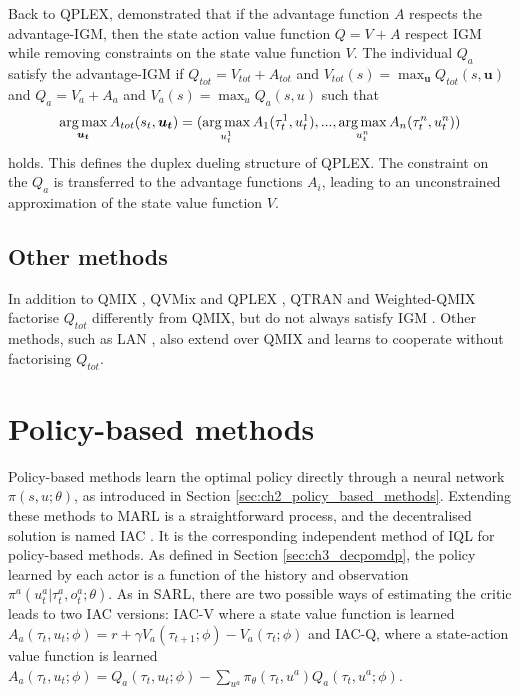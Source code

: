 Back to QPLEX, \citet{wang2021qplex} demonstrated that if the advantage function $A$ respects the advantage-IGM, then the state action value function $Q = V + A$ respect IGM while removing constraints on the state value function $V$.
The individual $Q_a$ satisfy the advantage-IGM if $Q_{tot}=V_{tot}+A_{tot}$ and $V_{tot}(s)=\max_{\mathbf{u}} Q_{tot}(s, \mathbf{u})$ and $Q_a=V_a+A_a$ and $V_a(s)=\max_{u} Q_a(s, u)$ such that 
\begin{equation}
    \argmax_{\mathbf{u_t}} A_{tot}(s_t, \mathbf{u_t}) =(\argmax_{u_t^{1}} A_{1}(\tau_t^{1}, u_t^{1}),...,\argmax_{u_t^{n}} A_{n}(\tau_t^{n}, u_t^{n}))    \label{eq:ch3_adv_igm}
\end{equation}
holds.
This defines the duplex dueling structure of QPLEX.
The constraint on the $Q_a$ is transferred to the advantage functions $A_i$, leading to an unconstrained approximation of the state value function $V$.

\subsection{Other methods}
In addition to QMIX \citep{Rashid2018}, QVMix \citep{leroy2020qvmix} and QPLEX \citep{wang2021qplex}, QTRAN \citep{Son2019QTRAN:Learning} and Weighted-QMIX \citep{rashid2020weighted} factorise $Q_{tot}$ differently from QMIX, but do not always satisfy IGM \citep{Son2019QTRAN:Learning}.
Other methods, such as LAN \citep{avalos2023local}, also extend over QMIX and learns to cooperate without factorising $Q_{tot}$.

\section{Policy-based methods}
\label{sec:ch3_policy}
Policy-based methods learn the optimal policy directly through a neural network $\pi(s, u;\theta)$, as introduced in Section \ref{sec:ch2_policy_based_methods}.
Extending these methods to MARL is a straightforward process, and the decentralised solution is named IAC \citep{foerster2017coma}. 
It is the corresponding independent method of IQL for policy-based methods.
As defined in Section \ref{sec:ch3_decpomdp}, the policy learned by each actor is a function of the history and observation $\pi^{a}(u_t^{a}|\tau_t^{a},o_t^{a};\theta)$.
As in SARL, there are two possible ways of estimating the critic leads to two IAC versions: IAC-V where a state value function is learned $A_a(\tau_t, u_t; \phi) = r + \gamma V_a(\tau_{t+1}; \phi) - V_a(\tau_t; \phi)$ and IAC-Q, where a state-action value function is learned $A_a(\tau_t, u_t; \phi) = Q_a(\tau_t, u_t; \phi) - \sum_{u^a}\pi_\theta(\tau_t, u^a)Q_a(\tau_t, u^a; \phi)$.

